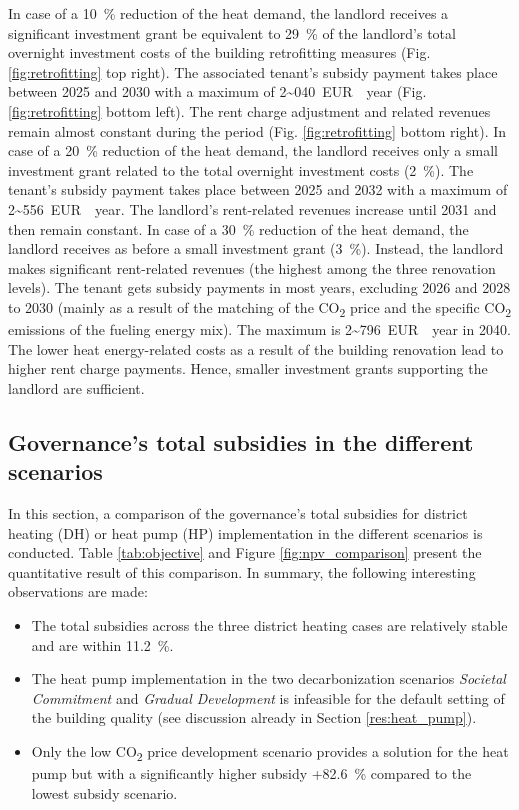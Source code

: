 In case of a \SI{10}{\%} reduction of the heat demand, the landlord receives a significant investment grant be equivalent to \SI{29}{\%} of the landlord's total overnight investment costs of the building retrofitting measures (Fig. \ref{fig:retrofitting} top right). The associated tenant's subsidy payment takes place between 2025 and 2030 with a maximum of \SI{2~040}{EUR \per year} (Fig. \ref{fig:retrofitting} bottom left). The rent charge adjustment and related revenues remain almost constant during the period (Fig. \ref{fig:retrofitting} bottom right). In case of a \SI{20}{\%} reduction of the heat demand, the landlord receives only a small investment grant related to the total overnight investment costs (\SI{2}{\%}). The tenant's subsidy payment takes place between 2025 and 2032 with a maximum of \SI{2~556}{EUR \per year}. The landlord's rent-related revenues increase until 2031 and then remain constant. In case of a \SI{30}{\%} reduction of the heat demand, the landlord receives as before a small investment grant (\SI{3}{\%}). Instead, the landlord makes significant rent-related revenues (the highest among the three renovation levels). The tenant gets subsidy payments in most years, excluding 2026 and 2028 to 2030 (mainly as a result of the matching of the CO\textsubscript{2} price and the specific CO\textsubscript{2} emissions of the fueling energy mix). The maximum is \SI{2~796}{EUR \per year} in 2040. The lower heat energy-related costs as a result of the building renovation lead to higher rent charge payments. Hence, smaller investment grants supporting the landlord are sufficient. 

\subsection{Governance's total subsidies in the different scenarios}\label{res:overview}
In this section, a comparison of the governance's total subsidies for district heating (DH) or heat pump (HP) implementation in the different scenarios is conducted. Table \ref{tab:objective} and Figure \ref{fig:npv_comparison} present the quantitative result of this comparison. In summary, the following interesting observations are made:

\begin{itemize}
	\item The total subsidies across the three district heating cases are relatively stable and are within \SI{11.2}{\%}.
	\item The heat pump implementation in the two decarbonization scenarios \textit{Societal Commitment} and \textit{Gradual Development} is infeasible for the default setting of the building quality (see discussion already in Section \ref{res:heat_pump}).
	\item Only the low CO\textsubscript{2} price development scenario provides a solution for the heat pump but with a significantly higher subsidy +\SI{82.6}{\%} compared to the lowest subsidy scenario.
\end{itemize}

